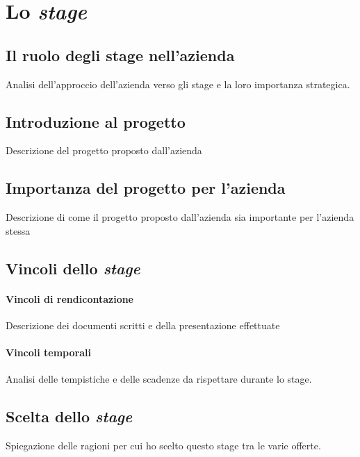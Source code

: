 \chapter{Lo \textit{stage}}
\label{cap:lo-stage}

\section{Il ruolo degli stage nell'azienda}
Analisi dell'approccio dell'azienda verso gli stage e la loro importanza strategica.

\section{Introduzione al progetto}
Descrizione del progetto proposto dall'azienda

\section{Importanza del progetto per l'azienda}
Descrizione di come il progetto proposto dall'azienda sia importante per l'azienda stessa

\section{Vincoli dello \textit{stage}}
\subsubsection{Vincoli di rendicontazione}
Descrizione dei documenti scritti e della presentazione effettuate
\subsubsection{Vincoli temporali}
Analisi delle tempistiche e delle scadenze da rispettare durante lo stage.


\section{Scelta dello \textit{stage}}
Spiegazione delle ragioni per cui ho scelto questo stage tra le varie offerte.
